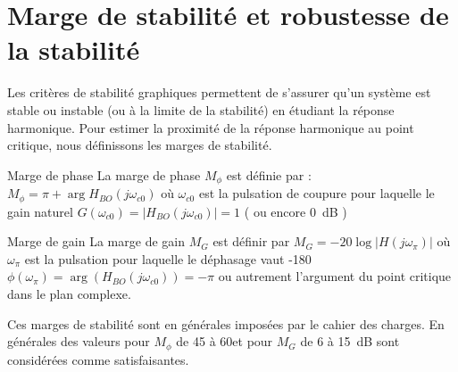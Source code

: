 \section{Marge de stabilité et robustesse de la stabilité}
Les critères de stabilité graphiques permettent de s'assurer qu'un système 
est stable ou instable (ou à la limite de la stabilité) en étudiant la réponse
harmonique. Pour estimer la proximité de la réponse harmonique au point 
critique, nous définissons les marges de stabilité. 
\begin{definition}{Marge de phase}
La marge de phase $M_{\phi}$ est définie par :
$M_\phi=\pi+\arg{H_{BO}(j\omega_{c0})}$ où $\omega_{c0}$ est la pulsation de 
coupure pour laquelle le gain naturel $G(\omega_{c0})=|H_{BO}(j\omega_{c0})|=1$
( ou encore 0~\si{\dB} ) 
\end{definition}
\begin{definition}{Marge de gain}
La marge de gain $M_G$ est définir par $M_G=-20\log{|H(j\omega_\pi)|}$ où 
$\omega_{\pi}$ est la pulsation pour laquelle le déphasage vaut 
-180\degreeSI $\phi(\omega_\pi)=\arg{(H_{BO}(j\omega_{c0}))}=-\pi$
ou autrement l'argument du point critique dans le plan complexe.
\end{definition}
Ces marges de stabilité sont en générales imposées par le cahier des charges.
En générales des valeurs pour $M_{\phi}$ de 45 à 60\degreeSI et
pour $M_G$ de 6 à 15~\si{\dB} sont considérées comme satisfaisantes.

